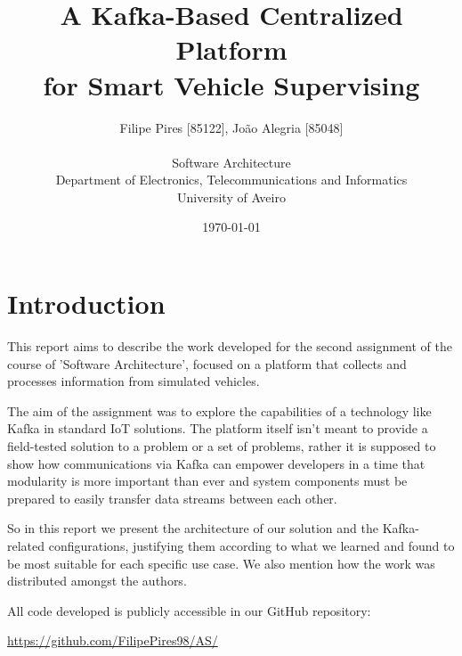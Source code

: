 \documentclass[12pt]{article}
\title{A Kafka-Based Centralized Platform\\for Smart Vehicle Supervising}
\author
{Filipe Pires [85122], João Alegria [85048]\\
\\
Software Architecture\\
\normalsize{Department of Electronics, Telecommunications and Informatics}\\
\normalsize{University of Aveiro}\\
}
\date{\today{}}
\begin{document}
 

\baselineskip18pt

\maketitle 

\section*{Introduction} %

This report aims to describe the work developed for the second assignment of the course of 'Software Architecture', focused on a platform that collects and 
processes information from simulated vehicles.

The aim of the assignment was to explore the capabilities of a technology like Kafka in standard IoT solutions.
The platform itself isn't meant to provide a field-tested solution to a problem or a set of problems, rather it is supposed to show how communications via Kafka 
can empower developers in a time that modularity is more important than ever and system components must be prepared to easily transfer data streams between each other.

So in this report we present the architecture of our solution and the Kafka-related configurations, justifying them according to what we learned and found to be 
most suitable for each specific use case.
We also mention how the work was distributed amongst the authors.

All code developed is publicly accessible in our GitHub repository:

\url{https://github.com/FilipePires98/AS/}

\end{document}
